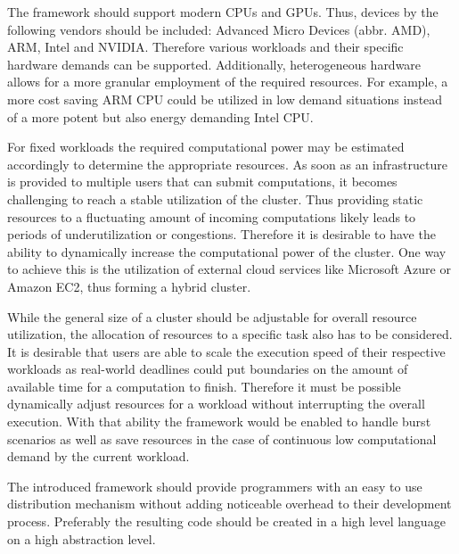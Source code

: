 \begin{description}[style=nextline]
    \item [Heterogeneity]
    The framework should support modern CPUs and GPUs. Thus, devices by the following vendors should be included: Advanced Micro Devices (abbr. AMD), ARM, Intel and NVIDIA. Therefore various workloads and their specific hardware demands can be supported. Additionally, heterogeneous hardware allows for a more granular employment of the required resources. For example, a more cost saving ARM CPU could be utilized in low demand situations instead of a more potent but also energy demanding Intel CPU.

    \item [Resource Scalability]
    For fixed workloads the required computational power may be estimated accordingly to determine the appropriate resources. As soon as an infrastructure is provided to multiple users that can submit computations, it becomes challenging to reach a stable utilization of the cluster. Thus providing static resources to a fluctuating amount of incoming computations likely leads to periods of underutilization or congestions. Therefore it is desirable to have the ability to dynamically increase the computational power of the cluster. One way to achieve this is the utilization of external cloud services like Microsoft Azure or Amazon EC2, thus forming a hybrid cluster.

    \item [Scalable Speed]
    While the general size of a cluster should be adjustable for overall resource utilization, the allocation of resources to a specific task also has to be considered. It is desirable that users are able to scale the execution speed of their respective workloads as real-world deadlines could put boundaries on the amount of available time for a computation to finish. Therefore it must be possible dynamically adjust resources for a workload without interrupting the overall execution. With that ability the framework would be enabled to handle burst scenarios as well as save resources in the case of continuous low computational demand by the current workload.

    \item [Ease of Programming]
    The introduced framework should provide programmers with an easy to use distribution mechanism without adding noticeable overhead to their development process. Preferably the resulting code should be created in a high level language on a high abstraction level.


\end{description}
